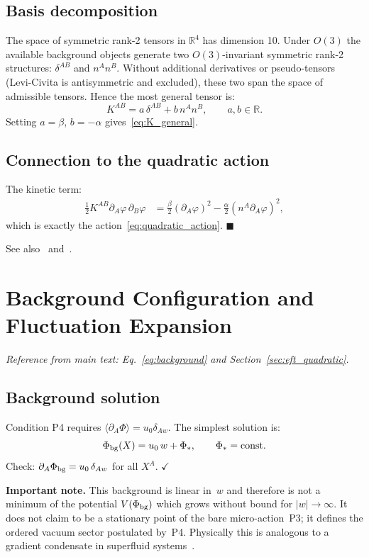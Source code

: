 \documentclass[11pt,a4paper]{article}
\numberwithin{equation}{section}
\begin{document}
\subsection*{Basis decomposition}

The space of symmetric rank-2 tensors in $\mathbb{R}^4$ has dimension 10.
Under $O(3)$ the available background objects generate two $O(3)$-invariant
symmetric rank-2 structures: $\delta^{AB}$ and $n^A n^B$.
Without additional derivatives or pseudo-tensors (Levi-Civita is
antisymmetric and excluded), these two span the space of admissible tensors.
Hence the most general tensor is:
\[
  K^{AB} = a\,\delta^{AB} + b\,n^A n^B,\qquad a,b\in\mathbb{R}.
\]
Setting $a=\beta$, $b=-\alpha$ gives~\eqref{eq:K_general}.

\subsection*{Connection to the quadratic action}

The kinetic term:
\begin{align}
  \tfrac{1}{2}K^{AB}\partial_A\varphi\,\partial_B\varphi
  &= \tfrac{\beta}{2}(\partial_A\varphi)^2
     - \tfrac{\alpha}{2}(n^A\partial_A\varphi)^2,
\end{align}
which is exactly the action~\eqref{eq:quadratic_action}. $\blacksquare$

See also~\cite[Ch.~2]{Weinberg1996} and~\cite{Landau1986Elasticity}.

\section{Background Configuration and Fluctuation Expansion}
\label{app:background_split}\label{eq:Phi_bg}

\textit{Reference from main text: Eq.~\eqref{eq:background}
and Section~\ref{sec:eft_quadratic}.}

\subsection*{Background solution}

Condition P4 requires $\langle\partial_A\Phi\rangle = u_0\delta_{Aw}$.
The simplest solution is:
\[
  \Phi_{\rm bg}(X) = u_0\,w + \Phi_*,\qquad \Phi_*=\text{const}.
\]
Check: $\partial_A\Phi_{\rm bg} = u_0\,\delta_{Aw}$ for all $X^A$. $\checkmark$

\noindent\textbf{Important note.}
This background is linear in~$w$ and therefore is not a minimum of
the potential $V(\Phi_{\rm bg})$ which grows without bound for $|w|\to\infty$.
It does not claim to be a stationary point of the bare micro-action~P3;
it defines the ordered vacuum sector postulated by~P4.
Physically this is analogous to a gradient condensate in superfluid
systems~\cite{Donnelly1991}.
\end{document}

